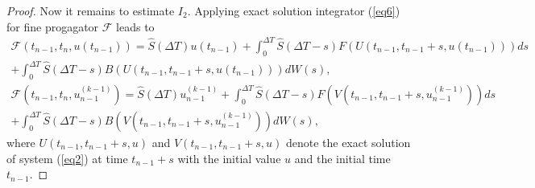 \documentclass[preprint,12pt]{elsarticle}
\newtheorem{proof}{Proof}
\begin{document}
\begin{proof}
	Now it remains to estimate $I_{2}$. Applying exact solution integrator (\ref{eq6}) for fine progagator $\mathcal{F}$ leads to
	\begin{align}
		\mathcal{F}(t_{n-1},t_{n},u(t_{n-1}))=\widehat S(\Delta T)u(t_{n-1})+\int_{0}^{\Delta T}\widehat S(\Delta T-s)F(U(t_{n-1},t_{n-1}+s,u(t_{n-1})))ds\nonumber\\
		+\int_{0}^{\Delta T}\widehat S(\Delta T-s)B(U(t_{n-1},t_{n-1}+s,u(t_{n-1})))dW(s),\label{eq17}\\
		\mathcal{F}(t_{n-1},t_{n},u_{n-1}^{(k-1)})=\widehat S(\Delta T)u_{n-1}^{(k-1)}+\int_{0}^{\Delta T}\widehat S(\Delta T-s)F(V(t_{n-1},t_{n-1}+s,u_{n-1}^{(k-1)}))ds\nonumber\\
		+\int_{0}^{\Delta T}\widehat S(\Delta T-s)B(V(t_{n-1},t_{n-1}+s,u_{n-1}^{(k-1)}))dW(s),\label{eq18}
	\end{align}
	where $U(t_{n-1},t_{n-1}+s,u)$ and $V(t_{n-1},t_{n-1}+s,u)$ denote the exact solution of system (\ref{eq2}) at time $t_{n-1}+s$ with the initial value $u$ and the initial time $t_{n-1}$.
	

\end{proof}
\end{document}
